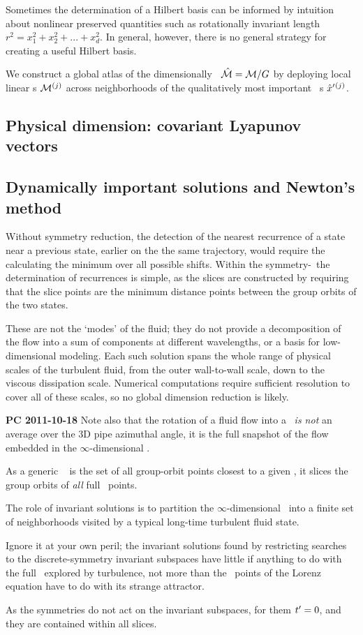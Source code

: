 Sometimes the determination of a Hilbert basis can be informed by
intuition about nonlinear preserved quantities such as rotationally
invariant length $r^2 = x_1^2 + x_2^2 + ... + x_d^2$. In general,
however, there is no general strategy for creating a useful Hilbert
basis.


We construct a
global atlas of the dimensionally \reducedsp\ $\hat{\cal M} = {\cal M}/G$ by
deploying local linear \slice s  ${\cal M}{}^{(j)}$ across neighborhoods of
the qualitatively most important \template\ {\cohStr s}
${\hat{x}'}{}^{(j)}$.


\subsection{Physical dimension: covariant Lyapunov vectors}

\subsection{Dynamically important solutions and Newton's method}
\label{s:reqva}

Without symmetry reduction, the detection of the nearest recurrence of a
state near a previous state, earlier on the the same trajectory, would
require the calculating the minimum over all possible shifts. Within the
symmetry-\reducedsp\ the determination of recurrences is simple, as the
slices are constructed by requiring that the slice points are the minimum
distance points between the group orbits of the two states.

These are not the `modes' of the fluid; {they
do not provide a decomposition of the flow into a sum of components at
different wavelengths, or a basis for low-dimensional
modeling.} Each such solution spans the whole range of physical scales of
the turbulent fluid, from the outer wall-to-wall scale, down to the
viscous dissipation scale. Numerical computations require sufficient
resolution to cover all of these scales, so no {global} dimension
reduction is likely.

        {\bf PC 2011-10-18} Note also that the rotation of a fluid flow
        into a \slice\ {\em is not} an average over the 3D pipe azimuthal
        angle, it is the full snapshot of the flow embedded in the
        $\infty$-dimensional \statesp.

As a generic \slice\  is the set of all group-orbit
points closest to a given {\template}, it slices the group orbits of
\emph{all} full \statesp\ points.

The role of invariant solutions is
to partition the $\infty$-dimensional \statesp\ into a finite set of
neighborhoods visited by a typical long-time turbulent fluid state.

Ignore it at
your own peril; the invariant solutions found by restricting
searches to the discrete-symmetry invariant subspaces have little if
anything to do with the full \statesp\ explored by turbulence, not more
than the \eqv\ points of the Lorenz equation have to do with its strange
attractor.

 As the symmetries do not act on
the invariant subspaces, for them $t'_{} = 0$, and they are
contained within all slices.
